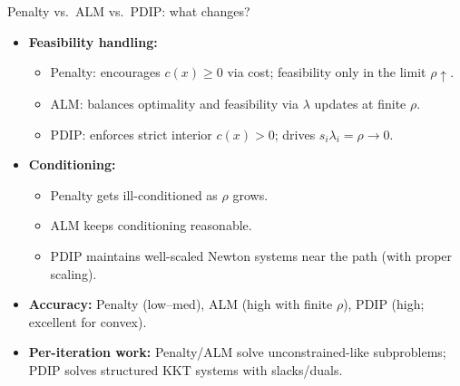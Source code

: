 \begin{frame}{Penalty vs.\ ALM vs.\ PDIP: what changes?}
\begin{itemize}
\item \textbf{Feasibility handling:}
\begin{itemize}
\item Penalty: encourages $c(x)\ge 0$ via cost; feasibility only in the limit $\rho\uparrow$.
\item ALM: balances optimality and feasibility via $\lambda$ updates at finite $\rho$.
\item PDIP: enforces strict interior $c(x)>0$; drives $s_i\lambda_i=\rho\to 0$.
\end{itemize}
\item \textbf{Conditioning:}
\begin{itemize}
\item Penalty gets ill-conditioned as $\rho$ grows.
\item ALM keeps conditioning reasonable.
\item PDIP maintains well-scaled Newton systems near the path (with proper scaling).
\end{itemize}
\item \textbf{Accuracy:} Penalty (low–med), ALM (high with finite $\rho$), PDIP (high; excellent for convex).
\item \textbf{Per-iteration work:} Penalty/ALM solve unconstrained-like subproblems; PDIP solves structured KKT systems with slacks/duals.
\end{itemize}

\end{frame}
  
 